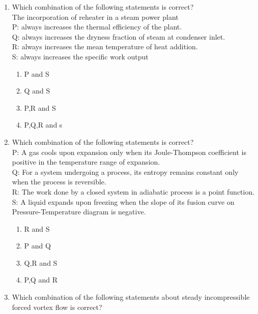 \documentclass[journal,9pt,onecolumn]{IEEEtran}
\begin{document}
\begin{enumerate}
\item Which combination of the following statements is correct?\\
The incorporation of reheater in a steam power plant\\
P:      always increases the thermal efficiency of the plant.\\
Q:      always increases the dryness fraction of steam at condenser inlet.\\
R:      always increases the mean temperature of heat addition.\\
S:  always increases the specific work output

\begin{multicols}{4}
    \begin{enumerate}
        \item P and S
        \item Q and S
        \item P,R and S
        \item P,Q,R and s
    \end{enumerate}
\end{multicols}

\item Which combination of the following statements is correct?\\
P: A gas cools upon expansion only when its Joule-Thompson coefficient is positive in the temperature range of expansion.\\
Q: For a system undergoing a process, its entropy remains constant only when the process is reversible.\\
R: The work done by a closed system in adiabatic process is a point function.\\
S: A liquid expands upon freezing when the slope of its fusion curve on Pressure-Temperature diagram is negative.
\begin{multicols}{4}
\begin{enumerate}
    \item R and S
    \item P and Q
    \item Q,R and S
    \item P,Q and R
\end{enumerate}
\end{multicols}


\item Which combination of the following statements about steady incompressible forced vortex flow is correct?


\end{enumerate}
\end{document}
